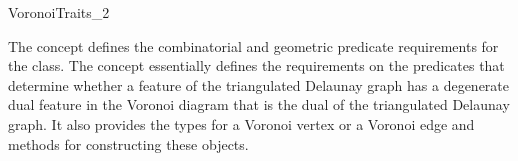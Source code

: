 


\begin{ccRefConcept}{VoronoiTraits_2}

\ccDefinition

The concept  defines the combinatorial and
geometric predicate requirements for the
 class. The
 concept essentially defines the requirements on
the predicates that determine whether a feature of the triangulated
Delaunay graph has a degenerate dual feature in the Voronoi diagram
that is the dual of the triangulated Delaunay graph. It also provides
the types for a Voronoi vertex or a Voronoi edge and methods for
constructing these objects.

\ccRefines
{}\\
\\


\end{ccRefConcept}
